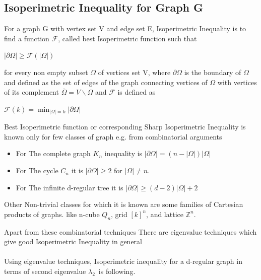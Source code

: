 \documentclass[oneside]{book}
\begin{document}
	\hfill \break
	
	
	\subsection{Isoperimetric Inequality for Graph G}
	For a graph G with vertex set V and edge set E, Isoperimetric Inequality is to find a function $\mathcal{F}$, called best  Isoperimetric function such that  \begin{center}
		$|\partial \Omega| \geq \mathcal{F}(|\Omega|)$  
	\end{center}   
	for every non empty subset $\Omega$ of vertices set V, where $\partial \Omega$ is the boundary of $\Omega$  and defined as the set of edges of the graph connecting vertices of $\Omega$ with vertices of its complement $\bar{\Omega} = V \backslash \Omega $ and $\mathcal{F}$ is defined as  \begin{center}
		$\mathscr{F}(k)=\min _{|\Omega|=k}|\partial \Omega|$\par
	\end{center} 
	Best Isoperimetric function or corresponding Sharp Isoperimetric Inequality is known only for few classes of graph e.g.
	from combinatorial arguments 
	\par
	\begin{itemize}
		\item For The complete graph $K_{n}$ inequality is $|\partial \Omega|=(n-|\Omega|) | \Omega|$ 
		\item For The cycle $C_{n}$ it is  $|\partial \Omega|\geq 2$ for $|\Omega| \neq n$.
		\item For The infinite d-regular tree it is $|\partial \Omega| \geq(d-2)| \Omega|+2$\par
	\end{itemize}
	
	
	
	Other Non-trivial classes for which it is known are some families of Cartesian products of graphs. like 
	n-cube $Q_{n}$, 
	grid $[k]^{n}$,
	and lattice $\mathbb{Z}^{n}$.
	\par
	Apart from these combinatorial techniques There are eigenvalue techniques which give good Isoperimetric Inequality in general \\\\
	
	Using eigenvalue techniques, 
	Isoperimetric inequality for a d-regular graph in terms of second eigenvalue $\lambda_2$\ is following. \par
	
\end{document}
